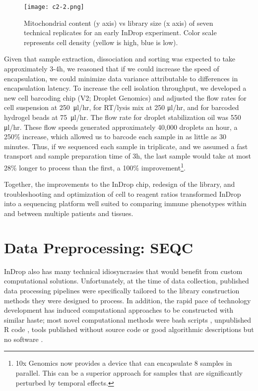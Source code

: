 \begin{figure} 
\centering
\texttt{[image: c2-2.png]}
\caption{Mitochondrial content (y axis) vs library size (x axis) of seven technical replicates for an early InDrop experiment. Color scale represents cell density (yellow is high, blue is low).}
\label{fig:c2-2}
\end{figure}

Given that sample extraction, dissociation and sorting was expected to take approximately 3-4h, we reasoned that if we could increase the speed of encapsulation, we could minimize data variance attributable to differences in encapsulation latency.  
To increase the cell isolation throughput, we developed a new cell barcoding chip (V2; Droplet Genomics) and adjusted the flow rates for cell suspension at 250~μl/hr, for RT/lysis mix at 250 μl/hr, and for barcoded hydrogel beads at 75~μl/hr. 
The flow rate for droplet stabilization oil was 550 μl/hr.
These flow speeds generated approximately 40,000 droplets an hour, a 250\% increase, which allowed us to barcode each sample in as little as 30 minutes. 
Thus, if we sequenced each sample in triplicate, and we assumed a fast transport and sample preparation time of 3h, the last sample would take at most 28\% longer to process than the first, a 100\% improvement\footnote{10x Genomics now provides a device that can encapsulate 8 samples in parallel. This can be a superior approach for samples that are significantly perturbed by temporal effects.}.

Together, the improvements to the InDrop chip, redesign of the library, and troubleshooting and optimization of cell to reagent ratios transformed InDrop into a sequencing platform well suited to comparing immune phenotypes within and between multiple patients and tissues. 

\section{Data Preprocessing: SEQC}

InDrop also has many technical idiosyncrasies that would benefit from custom computational solutions. 
Unfortunately, at the time of data collection, published data processing pipelines were specifically tailored to the library construction methods they were designed to process. 
In addition, the rapid pace of technology development has induced computational approaches to be constructed with similar haste; most novel computational methods were bash scripts \citep{Shalek2013,Shalek2014}, unpublished R code \citep{Jaitin2014}, tools published without source code \citep{Macosko2015} or good algorithmic descriptions but no software \citep{Klein2015}. 

